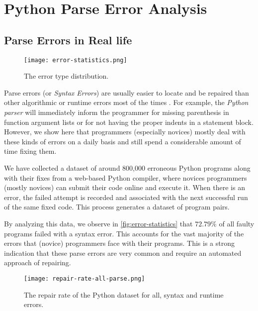 \section{Python Parse Error Analysis}
\label{sec:error-analysis}

\subsection{Parse Errors in Real life}
\label{sec:error-analysis:syntax}

\begin{figure}[h]
  \centering
  \texttt{[image: error-statistics.png]}
  \caption{The error type distribution.}
  \label{fig:error-statistics}
\end{figure}

Parse errors (or \emph{Syntax Errors}) are usually easier to locate and be
repaired than other algorithmic or runtime errors most of the times \citep{?}.
For example, the \emph{Python parser} will immediately inform the programmer for
missing parenthesis in function argument lists or for not having the proper
indents in a statement block. However, we show here that programmers (especially
novices) mostly deal with these kinds of errors on a daily basis and still spend
a considerable amount of time fixing them.

We have collected a dataset of around 800,000 erroneous Python programs along
with their fixes from a web-based Python compiler, where novices programmers
(mostly novices) can submit their code online and execute it. When there is an
error, the failed attempt is recorded and associated with the next successful
run of the same fixed code. This process generates a dataset of program pairs.

By analyzing this data, we observe in \autoref{fig:error-statistics} that $72.79
\% $ of all faulty programs failed with a syntax error. This accounts for the
vast majority of the errors that (novice) programmers face with their programs.
This is a strong indication that these parse errors are very common and require
an automated approach of repairing.

\begin{figure}[h]
  \centering
  \texttt{[image: repair-rate-all-parse.png]}
  \caption{The repair rate of the Python dataset for all, syntax and runtime
  errors.}
  \label{fig:repair-rate}
\end{figure}

